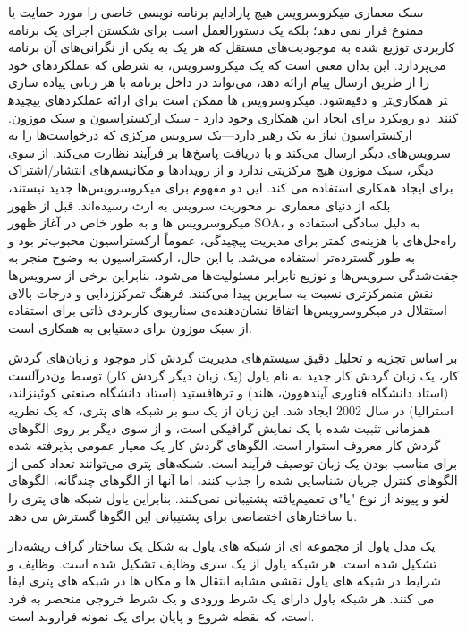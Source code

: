 سبک معماری میکروسرویس هیچ پارادایم برنامه نویسی خاصی را مورد حمایت یا ممنوع قرار نمی دهد؛ بلکه یک دستورالعمل است برای شکستن اجزای یک برنامه کاربردی توزیع شده به موجودیت‌های مستقل که هر یک به یکی از نگرانی‌های آن برنامه می‌پردازد. این بدان معنی است که یک میکروسرویس، به شرطی که عملکردهای خود را از طریق ارسال پیام ارائه دهد، می‌تواند در داخل برنامه با هر زبانی پیاده سازی شود.
میکروسرویس ها ممکن است برای ارائه عملکردهای پیچیده‎تر و دقیق‎تر همکاری کنند. دو رویکرد برای ایجاد این همکاری وجود دارد - سبک ارکستراسیون و سبک موزون. ارکستراسیون نیاز به یک رهبر دارد—یک سرویس مرکزی که درخواست‌ها را به سرویس‌های دیگر ارسال می‌کند و با دریافت پاسخ‌ها بر فرآیند نظارت می‌کند. از سوی دیگر، سبک موزون هیچ مرکزیتی ندارد و از رویدادها و مکانیسم‌های انتشار/اشتراک برای ایجاد همکاری استفاده می کند. این دو مفهوم برای میکروسرویس‌ها جدید نیستند، بلکه از دنیای معماری بر محوریت سرویس به ارث رسیده‌اند.
قبل از ظهور میکروسرویس ها و به طور خاص در آغاز ظهور SOA، به دلیل سادگی استفاده و راه‌حل‌های با هزینه‌ی کمتر برای مدیریت پیچیدگی، عموماً ارکستراسیون محبوب‌تر بود و به طور گسترده‌تر استفاده می‌شد. با این حال، ارکستراسیون به وضوح منجر به جفت‌شدگی سرویس‌ها و توزیع نابرابر مسئولیت‌ها می‌شود، بنابراین برخی از سرویس‌ها نقش متمرکزتری نسبت به سایرین پیدا می‌کنند. فرهنگ تمرکززدایی و درجات بالای استقلال در میکروسرویس‌ها اتفاقا نشان‌دهنده‌ی سناریوی کاربردی ذاتی برای استفاده از سبک موزون برای دستیابی به همکاری است.

بر اساس تجزیه و تحلیل دقیق سیستم‌های مدیریت گردش کار موجود و زبان‌های گردش کار، یک زبان گردش کار جدید به نام یاول (یک زبان دیگر گردش کار) توسط ون‌درآلست (استاد دانشگاه فناوری آیندهوون، هلند) و ترهافستید (استاد دانشگاه صنعتی کوئینزلند، استرالیا) در سال 2002 ایجاد شد. این زبان از یک سو بر شبکه های پتری، که یک نظریه همزمانی تثبیت شده با یک نمایش گرافیکی است، و از سوی دیگر بر روی الگوهای گردش کار معروف استوار است. الگوهای گردش کار یک معیار عمومی پذیرفته شده‌ برای مناسب بودن یک زبان توصیف فرآیند است. شبکه‌های پتری می‌توانند تعداد کمی از الگوهای کنترل جریان شناسایی شده را جذب کنند، اما آنها از الگوهای چندگانه، الگوهای لغو و پیوند از نوع "یا"ی  تعمیم‌یافته پشتیبانی نمی‌کنند. بنابراین یاول شبکه های پتری را با ساختارهای اختصاصی برای پشتیبانی این الگوها گسترش می دهد.

یک مدل یاول از مجموعه ای از شبکه های یاول به شکل یک ساختار گراف ریشه‌دار تشکیل شده است. هر شبکه یاول از یک سری وظایف تشکیل شده است. وظایف و شرایط در شبکه های یاول نقشی مشابه انتقال ها و مکان ها در شبکه های پتری ایفا می کنند. هر شبکه یاول دارای یک شرط ورودی و یک شرط خروجی منحصر به فرد است، که نقطه شروع و پایان برای یک نمونه فرآروند است.

